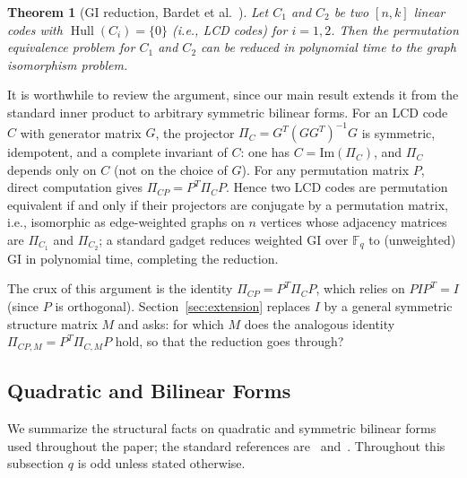 \documentclass[11pt]{article}
\newcommand{\FF}{\mathbb{F}}
\newcommand{\0}{\mathbf{0}}
\newcommand{\1}{\mathbf{1}}
\DeclareMathOperator{\Hull}{Hull}
\theoremstyle{plain}
\newtheorem{theorem}{Theorem}[section]
\theoremstyle{definition}
\theoremstyle{remark}
\begin{document}
\begin{theorem}[GI reduction, Bardet et al.\ \cite{bardet2019permutation}]
\label{thm:gi_reduction}
Let $C_1$ and $C_2$ be two $[n,k]$ linear codes with $\Hull(C_i) = \{0\}$ (i.e., LCD codes) for $i=1,2$. Then the permutation equivalence problem for $C_1$ and $C_2$ can be reduced in polynomial time to the graph isomorphism problem.
\end{theorem}

It is worthwhile to review the argument, since our main result extends it from the standard inner product to arbitrary symmetric bilinear forms. For an LCD code $C$ with generator matrix $G$, the projector $\Pi_C = G^T(GG^T)^{-1}G$ is symmetric, idempotent, and a complete invariant of $C$: one has $C = \mathrm{Im}(\Pi_C)$, and $\Pi_C$ depends only on $C$ (not on the choice of $G$). For any permutation matrix $P$, direct computation gives $\Pi_{CP} = P^T \Pi_C P$. Hence two LCD codes are permutation equivalent if and only if their projectors are conjugate by a permutation matrix, i.e., isomorphic as edge-weighted graphs on $n$ vertices whose adjacency matrices are $\Pi_{C_1}$ and $\Pi_{C_2}$; a standard gadget reduces weighted GI over $\FF_q$ to (unweighted) GI in polynomial time, completing the reduction.

The crux of this argument is the identity $\Pi_{CP} = P^T \Pi_C P$, which relies on $PIP^T = I$ (since $P$ is orthogonal). Section~\ref{sec:extension} replaces $I$ by a general symmetric structure matrix $M$ and asks: for which $M$ does the analogous identity $\Pi_{CP, M} = P^T \Pi_{C, M} P$ hold, so that the reduction goes through?

\subsection{Quadratic and Bilinear Forms}

We summarize the structural facts on quadratic and symmetric bilinear forms used throughout the paper; the standard references are~\cite{lidl1997finitefields} and~\cite{taylor1992geometry}. Throughout this subsection $q$ is odd unless stated otherwise.
\end{document}
